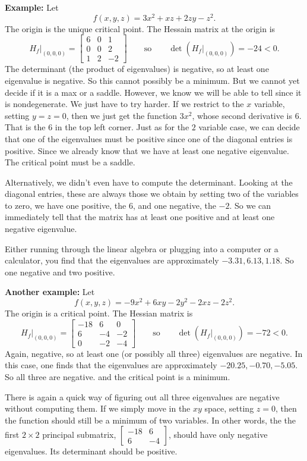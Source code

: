 \documentclass[12pt]{article}
\begin{document}
\textbf{Example:}
Let
\[
f(x,y,z) = 3x^2 + xz + 2zy - z^2 .
\]
The origin is the unique critical point.
The Hessain matrix at the origin is
\[
H_f\big|_{(0,0,0)}
=
\begin{bmatrix}
6 & 0 & 1 \\
0 & 0 & 2 \\
1 & 2 & -2
\end{bmatrix}
\qquad
\text{so}
\qquad
\det(H_f\big|_{(0,0,0)}) = -24 < 0 .
\]
The determinant (the product of eigenvalues)
is negative, so at least one eigenvalue is negative.  So this cannot
possibly be a minimum.  But we cannot yet decide if it is a max or a saddle.
However, we know we will be able to tell since it is nondegenerate.  We just
have to try harder.
If we restrict to the $x$ variable, setting $y=z=0$, then we just
get the function $3x^2$, whose second derivative is $6$.  That is the $6$
in the top left corner.  Just as for the $2$ variable case, we can decide
that one of the eigenvalues must be positive since one of the diagonal
entries is positive.
Since we already know that we have at least one negative eigenvalue.
The critical point must be a saddle.

Alternatively, we didn't even have to compute the determinant.  Looking at
the diagonal entries, these are always those we obtain by setting two of
the variables to zero, we have one positive, the $6$, and one negative, the
$-2$.  So we can immediately tell that the matrix has at least one positive and 
at least one negative eigenvalue.

Either running through the linear algebra or plugging into a
computer or a calculator, you find that
the eigenvalues are
approximately $-3.31, 6.13, 1.18$.  So one negative and two positive.

\bigskip

\textbf{Another example:}
Let
\[
f(x,y,z) = -9x^2 + 6xy -2y^2 -2xz -2 z^2 .
\]
The origin is a critical point.
The Hessian matrix is
\[
H_f\big|_{(0,0,0)}
=
\begin{bmatrix}
-18 & 6 & 0 \\
6 & -4 & -2 \\
0 & -2 & -4
\end{bmatrix}
\qquad
\text{so}
\qquad
\det(H_f\big|_{(0,0,0)}) = -72 < 0 .
\]
Again, negative, so at least one (or possibly all three) eigenvalues are
negative.  In this case, one finds that the eigenvalues are
approximately $-20.25, -0.70, -5.05$.  So all three are negative.
and the critical point is a minimum.

There is again a quick way of figuring out all three eigenvalues are
negative without computing them.  If we simply move in the $xy$ space,
setting $z=0$,
then the function should still be a minimum of two variables.
In other words, the 
the first $2 \times 2$ principal submatrix,
$\left[ \begin{smallmatrix} -18 & 6 \\ 6 & -4 \end{smallmatrix} \right]$,
should have only negative eigenvalues.  Its determinant should be positive.
\end{document}
